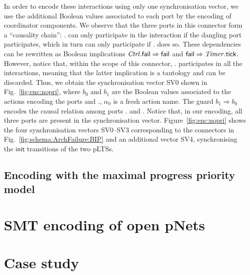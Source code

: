 \documentclass{llncs}
\newcommand{\fig}[1]{Fig.~\ref{fig:#1}}
\newcommand{\Fig}[1]{Figure~\ref{fig:#1}}
\newcommand{\ndash}{--}
\newcommand{\init} {\ensuremath{\mathsf{init}}}
\begin{document}
In order to encode these interactions using only one synchronisation vector, we use
the additional Boolean values associated to each port by the encoding
of coordinator components.  We observe that the three ports in this
connector form a ``causality chain'': {\NameCtrl.\PortFail} can only
participate in the interaction if the dangling port {\PortFail}
participates, which in turn can only participate if
{\NameTimer.\PortTick} does so.  These dependencies can be rewritten
as Boolean implications $\mathit{Ctrl}.\mathsf{fail} \Rightarrow \mathsf{fail}$
and $\mathsf{fail} \Rightarrow \mathit{Timer}.\mathsf{tick}$.  However, notice
that, within the scope of this connector, {\NameTimer.\PortTick}
participates in all the interactions, meaning that the latter
implication is a tautology and can be discarded.  Thus, we obtain the
synchronisation vector SV0 shown in \fig{enc:nopri}, where $b_0$ and
$b_1$ are the Boolean values associated to the actions encoding the
ports {\PortFail} and {\NameCtrl.\PortFail}, $\alpha_0$ is a fresh
action name.  The guard $b_1 \Rightarrow b_0$ encodes the causal
relation among ports {\NameCtrl.\PortFail} and {\PortFail}.  Notice
that, in our encoding, all three ports are present in the
synchronisation vector.  \Fig{enc:nopri} shows
the four synchronisation vectors SV0\ndash SV3 corresponding to the
connectors in \fig{schema:ArchFailure:BIP} and an additional vector
SV4, synchronising the {\init} transitions of the two pLTSs.

\subsection{Encoding with the maximal progress priority model}
\label{secn:enc:maxprog}




\section{SMT encoding of open pNets}
\label{secn:smt}


\section{Case study}
\label{secn:case-study}
\end{document}
